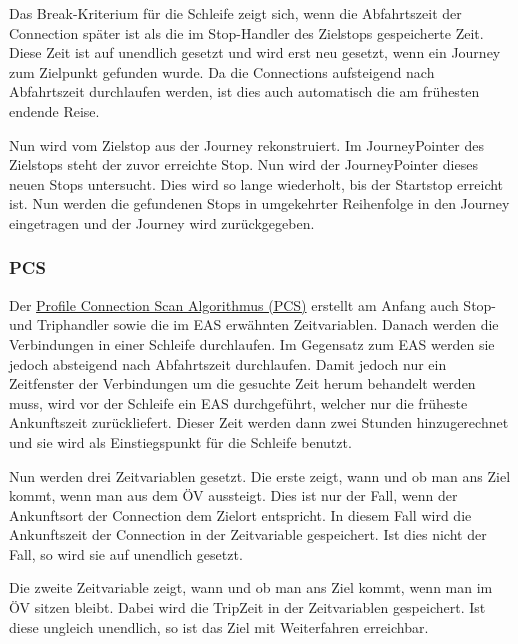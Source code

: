 Das Break-Kriterium für die Schleife zeigt sich, wenn die Abfahrtszeit der Connection später ist als die im Stop-Handler des Zielstops gespeicherte Zeit. Diese Zeit ist auf unendlich gesetzt und wird erst neu gesetzt, wenn ein Journey zum Zielpunkt gefunden wurde. Da die Connections aufsteigend nach Abfahrtszeit durchlaufen werden, ist dies auch automatisch die am frühesten endende Reise. 
\newline


Nun wird vom Zielstop aus der Journey rekonstruiert. Im JourneyPointer des Zielstops steht der zuvor erreichte Stop. Nun wird der JourneyPointer dieses neuen Stops untersucht. Dies wird so lange wiederholt, bis der Startstop erreicht ist. Nun werden die gefundenen Stops in umgekehrter Reihenfolge in den Journey eingetragen und der Journey wird zurückgegeben.
\subsubsection{PCS}
Der \hyperlink{PCS}{Profile Connection Scan Algorithmus (PCS)} erstellt am Anfang auch Stop- und Triphandler sowie die im EAS erwähnten Zeitvariablen. Danach werden die Verbindungen in einer Schleife durchlaufen. Im Gegensatz zum EAS werden sie jedoch absteigend nach Abfahrtszeit durchlaufen. Damit jedoch nur ein Zeitfenster der Verbindungen um die gesuchte Zeit herum behandelt werden muss, wird vor der Schleife ein EAS durchgeführt, welcher nur die früheste Ankunftszeit zurückliefert. Dieser Zeit werden dann zwei Stunden hinzugerechnet und sie wird als Einstiegspunkt für die Schleife benutzt. 
\newline


Nun werden drei Zeitvariablen gesetzt. Die erste zeigt, wann und ob man ans Ziel kommt, wenn man aus dem ÖV aussteigt. Dies ist nur der Fall, wenn der Ankunftsort der Connection dem Zielort entspricht. In diesem Fall wird die Ankunftszeit der Connection in der Zeitvariable gespeichert. Ist dies nicht der Fall, so wird sie auf unendlich gesetzt.
\newline


Die zweite Zeitvariable zeigt, wann und ob man ans Ziel kommt, wenn man im ÖV sitzen bleibt. Dabei wird die TripZeit in der Zeitvariablen gespeichert. Ist diese ungleich unendlich, so ist das Ziel mit Weiterfahren erreichbar.
\newline


